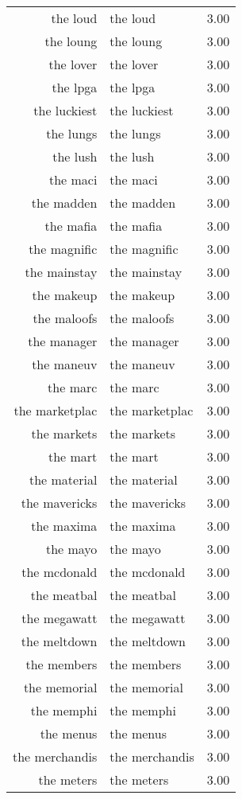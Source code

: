 \begin{table}[ht]
\begin{tabular}{rlr}
  the loud & the loud & 3.00 \\ 
  the loung & the loung & 3.00 \\ 
  the lover & the lover & 3.00 \\ 
  the lpga & the lpga & 3.00 \\ 
  the luckiest & the luckiest & 3.00 \\ 
  the lungs & the lungs & 3.00 \\ 
  the lush & the lush & 3.00 \\ 
  the maci & the maci & 3.00 \\ 
  the madden & the madden & 3.00 \\ 
  the mafia & the mafia & 3.00 \\ 
  the magnific & the magnific & 3.00 \\ 
  the mainstay & the mainstay & 3.00 \\ 
  the makeup & the makeup & 3.00 \\ 
  the maloofs & the maloofs & 3.00 \\ 
  the manager & the manager & 3.00 \\ 
  the maneuv & the maneuv & 3.00 \\ 
  the marc & the marc & 3.00 \\ 
  the marketplac & the marketplac & 3.00 \\ 
  the markets & the markets & 3.00 \\ 
  the mart & the mart & 3.00 \\ 
  the material & the material & 3.00 \\ 
  the mavericks & the mavericks & 3.00 \\ 
  the maxima & the maxima & 3.00 \\ 
  the mayo & the mayo & 3.00 \\ 
  the mcdonald & the mcdonald & 3.00 \\ 
  the meatbal & the meatbal & 3.00 \\ 
  the megawatt & the megawatt & 3.00 \\ 
  the meltdown & the meltdown & 3.00 \\ 
  the members & the members & 3.00 \\ 
  the memorial & the memorial & 3.00 \\ 
  the memphi & the memphi & 3.00 \\ 
  the menus & the menus & 3.00 \\ 
  the merchandis & the merchandis & 3.00 \\ 
  the meters & the meters & 3.00 \\ 

\end{tabular}
\end{table}
